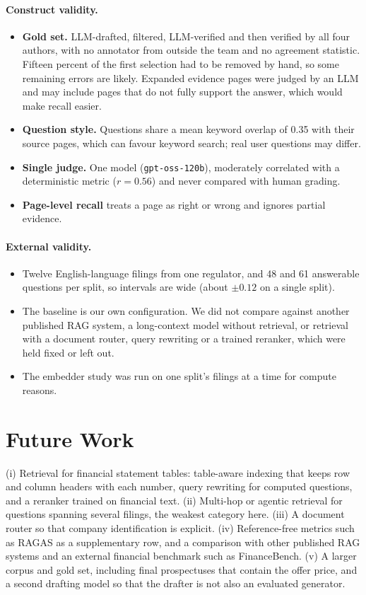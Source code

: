 \documentclass[11pt,a4paper]{article}
\begin{document}
\paragraph{Construct validity.}
\begin{itemize}
\item \textbf{Gold set.} LLM-drafted, filtered, LLM-verified and then verified by all four authors, with no annotator from outside the team and no agreement statistic. Fifteen percent of the first selection had to be removed by hand, so some remaining errors are likely. Expanded evidence pages were judged by an LLM and may include pages that do not fully support the answer, which would make recall easier.
\item \textbf{Question style.} Questions share a mean keyword overlap of 0.35 with their source pages, which can favour keyword search; real user questions may differ.
\item \textbf{Single judge.} One model (\texttt{gpt-oss-120b}), moderately correlated with a deterministic metric ($r=0.56$) and never compared with human grading.
\item \textbf{Page-level recall} treats a page as right or wrong and ignores partial evidence.
\end{itemize}
\paragraph{External validity.}
\begin{itemize}
\item Twelve English-language filings from one regulator, and 48 and 61 answerable questions per split, so intervals are wide (about $\pm0.12$ on a single split).
\item The baseline is our own configuration. We did not compare against another published RAG system, a long-context model without retrieval, or retrieval with a document router, query rewriting or a trained reranker, which were held fixed or left out.
\item The embedder study was run on one split's filings at a time for compute reasons.
\end{itemize}

\section{Future Work}
(i) Retrieval for financial statement tables: table-aware indexing that keeps row and column headers with each number, query rewriting for computed questions, and a reranker trained on financial text. (ii) Multi-hop or agentic retrieval for questions spanning several filings, the weakest category here. (iii) A document router so that company identification is explicit. (iv) Reference-free metrics such as RAGAS as a supplementary row, and a comparison with other published RAG systems and an external financial benchmark such as FinanceBench. (v) A larger corpus and gold set, including final prospectuses that contain the offer price, and a second drafting model so that the drafter is not also an evaluated generator.
\end{document}

